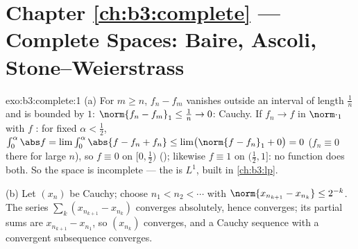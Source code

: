 \section*{Chapter \ref{ch:b3:complete} --- Complete Spaces:
Baire, Ascoli, Stone--Weierstrass}

\begin{solution}{exo:b3:complete:1}
(a) For $m \geq n$, $f_n - f_m$ vanishes outside an interval of
length $\frac1n$ and is bounded by $1$: $\norm{f_n - f_m}_1
\leq \frac1n \to 0$: Cauchy. If $f_n \to f$ in
$\norm\cdot_1$ with $f$ : for fixed $\alpha <
\frac12$, $\int_0^{\alpha}\abs f = \lim \int_0^\alpha\abs{f -
f_n + f_n} \leq \lim\bigl(\norm{f - f_n}_1 + 0\bigr) = 0$
($f_n \equiv 0$ there for large $n$), so $f \equiv 0$ on
$[0, \frac12)$ (); likewise $f \equiv 1$ on
$(\frac12, 1]$: no  function does both. So the space
is incomplete --- the  is $L^1$, built in
\cref{ch:b3:lp}.

(b) Let $(x_n)$ be Cauchy; choose $n_1 < n_2 < \cdots$ with
$\norm{x_{n_{k+1}} - x_{n_k}} \leq 2^{-k}$. The series
$\sum_k (x_{n_{k+1}} - x_{n_k})$ converges absolutely, hence
converges; its partial sums are $x_{n_{k+1}} - x_{n_1}$, so
$(x_{n_k})$ converges, and a Cauchy sequence with a convergent
subsequence converges.
\end{solution}

